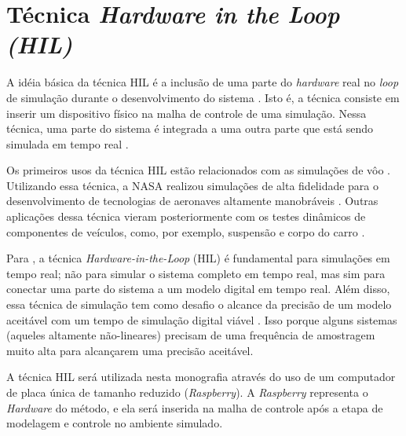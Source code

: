 \section{Técnica \textit{Hardware in the Loop (HIL)}}

A idéia básica da técnica HIL é a inclusão de 
uma parte do \textit{hardware} real no \textit{loop} de simulação durante o desenvolvimento 
do sistema \cite{Bacic}. Isto é, a técnica consiste em inserir um dispositivo físico 
na malha de controle de uma simulação. Nessa técnica, uma parte do sistema é integrada 
a uma outra parte que está sendo simulada em tempo real \cite{Abourida}.

Os primeiros usos da técnica HIL estão relacionados com 
as simulações de vôo \cite{Isermann}. Utilizando essa técnica, a NASA realizou simulações de alta 
fidelidade para o desenvolvimento de tecnologias de aeronaves altamente manobráveis \cite{Evans}. 
Outras aplicações dessa técnica vieram posteriormente com os testes dinâmicos de componentes 
de veículos, como, por exemplo, suspensão e corpo do carro \cite{Isermann}.

Para , a técnica \textit{Hardware-in-the-Loop} (HIL) é fundamental
para simulações em tempo real; não para simular o sistema completo em tempo real, mas sim
para conectar uma parte do sistema a um modelo digital em tempo real. Além disso, essa técnica
de simulação tem como desafio o alcance da precisão de um modelo aceitável com um tempo de simulação 
digital viável \cite{Abourida}. Isso porque alguns sistemas (aqueles altamente não-lineares)
precisam de uma frequência de amostragem muito alta para alcançarem uma precisão aceitável.

A técnica HIL será utilizada nesta monografia através do uso de um computador de placa única
de tamanho reduzido (\textit{Raspberry}). A \textit{Raspberry} representa o \textit{Hardware} 
do método, e ela será inserida na malha de controle após a etapa de modelagem e controle no 
ambiente simulado.

\clearpage